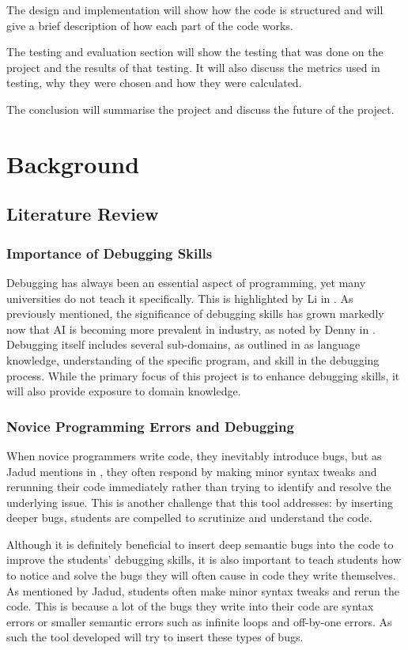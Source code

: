\documentclass[12pt]{extarticle}
\begin{document}
The design and implementation will show how the code is structured and will give a brief description of how each part of the code works.

The testing and evaluation section will show the testing that was done on the project and the results of that testing. It will also discuss the metrics used in testing, why they were chosen and how they were calculated.

The conclusion will summarise the project and discuss the future of the project.
\newpage
\section{Background}

\subsection{Literature Review}

\subsubsection{Importance of Debugging Skills}

Debugging has always been an essential aspect of programming, yet many universities do not teach it specifically. This is highlighted by Li in \cite{li2019}. As previously mentioned, the significance of debugging skills has grown markedly now that AI is becoming more prevalent in industry, as noted by Denny in \cite{denny2024}. Debugging itself includes several sub-domains, as outlined in \cite{li2019} as language knowledge, understanding of the specific program, and skill in the debugging process. While the primary focus of this project is to enhance debugging skills, it will also provide exposure to domain knowledge.

\subsubsection{Novice Programming Errors and Debugging}

When novice programmers write code, they inevitably introduce bugs, but as Jadud mentions in \cite{jadud2006}, they often respond by making minor syntax tweaks and rerunning their code immediately rather than trying to identify and resolve the underlying issue. This is another challenge that this tool addresses: by inserting deeper bugs, students are compelled to scrutinize and understand the code.

Although it is definitely beneficial to insert deep semantic bugs into the code to improve the students' debugging skills, it is also important to teach students how to notice and solve the bugs they will often cause in code they write themselves. As mentioned by Jadud, students often make minor syntax tweaks and rerun the code. This is because a lot of the bugs they write into their code are syntax errors or smaller semantic errors such as infinite loops and off-by-one errors. As such the tool developed will try to insert these types of bugs.
\end{document}
